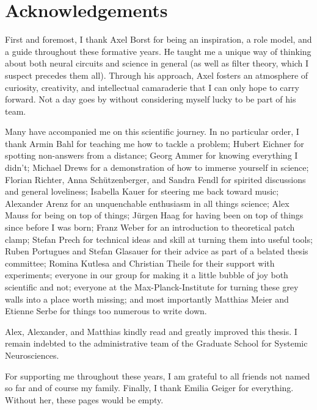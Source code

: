 
\chapter*{Acknowledgements}
\label{chp:ack}

First and foremost, I thank Axel Borst for being an inspiration, a role model, and a guide throughout these formative years. He taught me a unique way of thinking about both neural circuits and science in general (as well as filter theory, which I suspect precedes them all). Through his approach, Axel fosters an atmosphere of curiosity, creativity, and intellectual camaraderie that I can only hope to carry forward. Not a day goes by without considering myself lucky to be part of his team.

Many have accompanied me on this scientific journey. In no particular order, I thank
Armin Bahl for teaching me how to tackle a problem;
Hubert Eichner for spotting non-answers from a distance;
Georg Ammer for knowing everything I didn't;
Michael Drews for a demonstration of how to immerse yourself in science;
Florian Richter, Anna Schützenberger, and Sandra Fendl for spirited discussions and general loveliness;
Isabella Kauer for steering me back toward music;
Alexander Arenz for an unquenchable enthusiasm in all things science;
Alex Mauss for being on top of things;
Jürgen Haag for having been on top of things since before I was born;
Franz Weber for an introduction to theoretical patch clamp;
Stefan Prech for technical ideas and skill at turning them into useful tools;
Ruben Portugues and Stefan Glasauer for their advice as part of a belated thesis committee;
Romina Kutlesa and Christian Theile for their support with experiments;
everyone in our group for making it a little bubble of joy both scientific and not;
everyone at the Max-Planck-Institute for turning these grey walls into a place worth missing;
and most importantly Matthias Meier and Etienne Serbe for things too numerous to write down.

Alex, Alexander, and Matthias kindly read and greatly improved this thesis. I remain indebted to the administrative team of the Graduate School for Systemic Neurosciences.

For supporting me throughout these years, I am grateful to all friends not named so far and of course my family. Finally, I thank Emilia Geiger for everything. Without her, these pages would be empty.